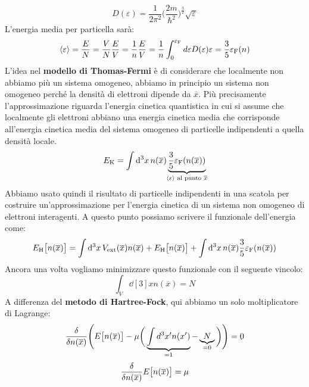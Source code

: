 \begin{equation*}
    D(\varepsilon)=\frac{1}{2\pi^2}\bigg(\frac{2m}{\hbar^2}\bigg)^{\frac 32}\sqrt\varepsilon
\end{equation*}
L'energia media per particella sarà:
\begin{equation*}
    \expval{\varepsilon}=\frac EN=\frac VN \frac EV = \frac 1 n \frac EV=\frac 1 n \int_{0}^{\varepsilon_{\text F}}d\varepsilon D(\varepsilon)\varepsilon = \frac 3 5 \varepsilon_{\text F}(n)
\end{equation*}
L'idea nel \textbf{modello di Thomas-Fermi} è di considerare che localmente non abbiamo più un sistema omogeneo, abbiamo in principio un sistema non omogeneo perché la densità di elettroni dipende da $\overline x$. Più precisamente l'approssimazione riguarda l'energia cinetica quantistica in cui si assume che localmente gli elettroni abbiano una energia cinetica media che corrisponde all'energia cinetica media del sistema omogeneo di particelle indipendenti a quella densità locale.
\begin{equation*}
    E_{\text K}=\int \dd[3]{x}n(\overline x)\underbrace{\frac 35 \varepsilon_{\text F}(n(\overline x))}_{\mathclap{\expval{\varepsilon} \text{ al punto } \overline x}}
\end{equation*}
Abbiamo usato quindi il risultato di particelle indipendenti in una scatola per costruire un'approssimazione per l'energia cinetica di un sistema non omogeneo di elettroni interagenti. A questo punto possiamo scrivere il funzionale dell'energia come:
\begin{equation*}
    E_{\text H}\big[n(\overline x)\big]=\int \dd[3]{x} V_{\text{ext}}(\overline x)n(\overline x)+E_{\text H}\big[n(\overline x)\big]+\int \dd[3]{x}n(\overline x)\frac 35\varepsilon_{\text F}(n(\overline x))
\end{equation*}
Ancora una volta vogliamo minimizzare questo funzionale con il seguente vincolo:
\begin{equation*}
    \int_V \dd[3]{x} n(\overline x)=N
\end{equation*}
A differenza del \textbf{metodo di Hartree-Fock}, qui abbiamo un solo moltiplicatore di Lagrange:
\begin{equation*}
    \functionalderivative{n(\overline x)}\Bigg(E\big[n(\overline x)\big]-\mu\bigg(\underbrace{\int d^3x'n(x')}_{=1}-\underbrace{N}_{=0}\bigg)\Bigg)=0
\end{equation*}
\begin{equation*}
    \functionalderivative{n(\overline x)}E\big[n(\overline x)\big]=\mu
\end{equation*}
